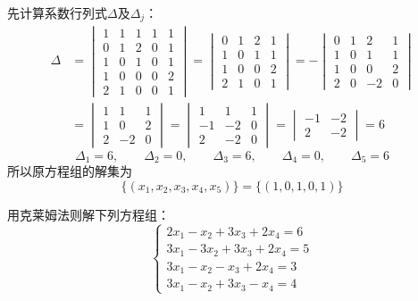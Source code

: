 \begin{solution}
先计算系数行列式$\Delta$及$\Delta_j$： 
\[\begin{split}
   \Delta&=\begin{vmatrix}
  1&1&1&1&1\\
  0&1&2&0&1\\
  1&0&1&0&1\\
  1&0&0&0&2\\
  2&1&0&0&1     
   \end{vmatrix}=\begin{vmatrix}
       0&1&2&1\\
       1&0&1&1\\
       1&0&0&2\\
       2&1&0&1
   \end{vmatrix}=-\begin{vmatrix}
    0&1&2&1\\
    1&0&1&1\\
    1&0&0&2\\
    2&0&-2&0   
   \end{vmatrix}\\
   &=\begin{vmatrix}
       1&1&1\\
       1&0&2\\
       2&-2&0
   \end{vmatrix} =\begin{vmatrix}
       1&1&1\\-1&-2&0\\2&-2&0
   \end{vmatrix}=\begin{vmatrix}
      -1&-2\\2&-2 
   \end{vmatrix}=6
\end{split}\]
\[\Delta_1=6,\qquad \Delta_2=0,\qquad \Delta_3=6,\qquad \Delta_4=0,\qquad \Delta_5=6 \]
所以原方程组的解集为
\[\{(x_1,x_2,x_3,x_4,x_5)\}=\{(1,0,1,0,1)\}\]

\end{solution}


\begin{ex}
    用克莱姆法则解下列方程组：
\[\begin{cases}
    2x_1-x_2+3x_3+2x_4=6\\
    3x_1-3x_2+3x_3+2x_4=5\\
    3x_1-x_2-x_3+2x_4=3\\
    3x_1-x_2+3x_3-x_4=4
\end{cases}  \]
\end{ex}

